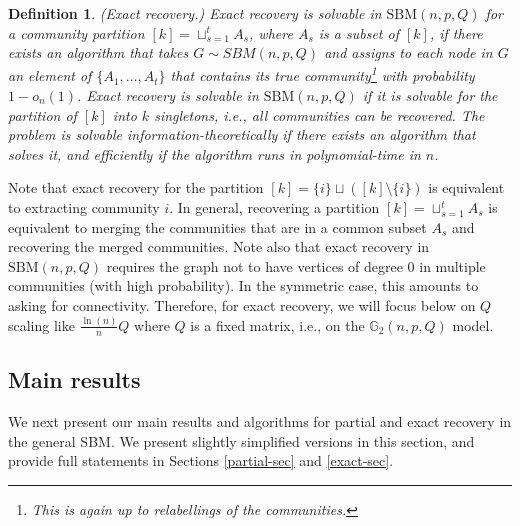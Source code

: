 \documentclass[11pt]{article}
\newcommand{\gs}{\mathbb{G}_2}
\newcommand{\1}{\mathbb{1}}
\newtheorem{definition}{Definition}
\begin{document}
\begin{definition} (Exact recovery.) 
Exact recovery is solvable in $\text{SBM}(n,p,Q)$ for a community partition $[k] = \sqcup_{s=1}^t A_s$, where $A_s$ is a subset of $[k]$, if there exists an algorithm that takes $G \sim SBM(n,p,Q)$ and assigns to each node in $G$ an element of $\{A_1,\dots,A_t\}$ that contains its true community\footnote{This is again up to relabellings of the communities.} with probability $1-o_n(1)$.  Exact recovery is solvable in $\text{SBM}(n,p,Q)$ if it is solvable for the partition of $[k]$ into $k$ singletons, i.e., all communities can be recovered. The problem is solvable information-theoretically if there exists an algorithm that solves it, and efficiently if the algorithm runs in polynomial-time in $n$. 
\end{definition}
Note that exact recovery for the partition $[k]=\{i\} \sqcup ([k] \setminus \{i\})$ is equivalent to extracting community $i$. In general, recovering a partition $[k] = \sqcup_{s=1}^t A_s$ is equivalent to merging the communities that are in a common subset $A_s$ and recovering the merged communities. 
Note also that exact recovery in $\text{SBM}(n,p,Q)$ requires the graph not to have vertices of degree $0$ in multiple communities (with high probability). In the symmetric case, this amounts to asking for connectivity. 
Therefore, for exact recovery, we will focus below on $Q$ scaling like $\frac{\ln(n)}{n}Q$ where $Q$ is a fixed matrix, i.e., on the $\gs(n,p,Q)$ model.


\subsection{Main results}\label{main-res}
We next present our main results and algorithms for partial and exact recovery in the general SBM. We present slightly simplified versions in this section, and provide full statements in Sections \ref{partial-sec} and \ref{exact-sec}. \\
\end{document}
